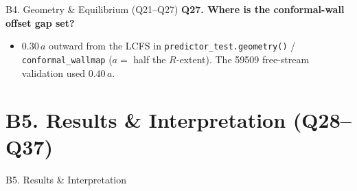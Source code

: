 \documentclass[11pt,aspectratio=169]{beamer}
\newcommand{\qitem}[1]{\medskip\textbf{#1}\par}
\begin{document}
\begin{frame}[allowframebreaks]{B4. Geometry \& Equilibrium (Q21--Q27)}
\qitem{Q27. Where is the conformal-wall offset gap set?}
\begin{itemize}
\item $0.30\,a$ outward from the LCFS in \texttt{predictor\_test.geometry()} /
      \texttt{conformal\_wallmap} ($a =$ half the $R$-extent). The 59509 free-stream validation
      used $0.40\,a$.
\end{itemize}
\end{frame}

\section{B5. Results \& Interpretation (Q28--Q37)}
\begin{frame}
\centering\vfill
{\Large\color{key} B5. Results \& Interpretation}\par
{}
\vfill
\end{frame}
\end{document}
